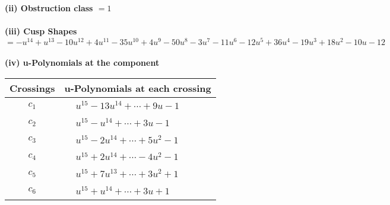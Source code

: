 \documentclass[1p]{elsarticle_modified}
\theoremstyle{definition}
\begin{document}
\flushleft \textbf{(ii) Obstruction class $= 1$}\\~\\
\flushleft \textbf{(iii) Cusp Shapes $= - u^{14}+u^{13}-10 u^{12}+4 u^{11}-35 u^{10}+4 u^9-50 u^8-3 u^7-11 u^6-12 u^5+36 u^4-19 u^3+18 u^2-10 u-12$}\\~\\
\newpage\renewcommand{\arraystretch}{1}
\flushleft \textbf{(iv) u-Polynomials at the component}\newline \\
\begin{tabular}{m{50pt}|m{274pt}}
Crossings & \hspace{64pt}u-Polynomials at each crossing \\
\hline $$\begin{aligned}c_{1}\end{aligned}$$&$\begin{aligned}
&u^{15}-13 u^{14}+\cdots+9 u-1
\end{aligned}$\\
\hline $$\begin{aligned}c_{2}\end{aligned}$$&$\begin{aligned}
&u^{15}- u^{14}+\cdots+3 u-1
\end{aligned}$\\
\hline $$\begin{aligned}c_{3}\end{aligned}$$&$\begin{aligned}
&u^{15}-2 u^{14}+\cdots+5 u^2-1
\end{aligned}$\\
\hline $$\begin{aligned}c_{4}\end{aligned}$$&$\begin{aligned}
&u^{15}+2 u^{14}+\cdots-4 u^2-1
\end{aligned}$\\
\hline $$\begin{aligned}c_{5}\end{aligned}$$&$\begin{aligned}
&u^{15}+7 u^{13}+\cdots+3 u^2+1
\end{aligned}$\\
\hline $$\begin{aligned}c_{6}\end{aligned}$$&$\begin{aligned}
&u^{15}+u^{14}+\cdots+3 u+1
\end{aligned}$\\

\end{tabular}
\end{document}
